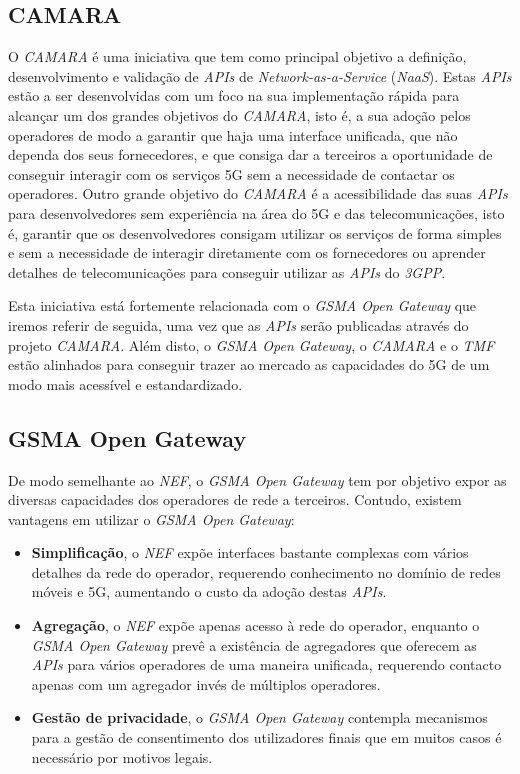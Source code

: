 \subsection{CAMARA}

O \emph{CAMARA} é uma iniciativa que tem como principal objetivo a definição,
desenvolvimento e validação de \emph{APIs} de \emph{Network-as-a-Service}
(\emph{NaaS})\cite{10.1145/3538401.3546825}. Estas \emph{APIs} estão a ser
desenvolvidas com um foco na sua implementação rápida para alcançar um dos
grandes objetivos do \emph{CAMARA}, isto é, a sua adoção pelos operadores de
modo a garantir que haja uma interface unificada, que não dependa dos seus
fornecedores, e que consiga dar a terceiros a oportunidade de conseguir
interagir com os serviços 5G sem a necessidade de contactar os operadores.
Outro grande objetivo do \emph{CAMARA} é a acessibilidade das suas \emph{APIs}
para desenvolvedores sem experiência na área do 5G e das telecomunicações, isto
é, garantir que os desenvolvedores consigam utilizar os serviços de forma
simples e sem a necessidade de interagir diretamente com os fornecedores ou
aprender detalhes de telecomunicações para conseguir utilizar as \emph{APIs} do
\emph{3GPP}.

Esta iniciativa está fortemente relacionada com o \emph{GSMA Open Gateway} que iremos referir
de seguida, uma vez que as \emph{APIs} serão publicadas através do projeto
\emph{CAMARA}\cite{5gamericas}. Além disto, o \emph{GSMA Open Gateway}, o
\emph{CAMARA} e o \emph{TMF} estão alinhados para conseguir trazer ao mercado
as capacidades do 5G de um modo mais acessível e estandardizado.

\subsection{GSMA Open Gateway}

De modo semelhante ao \emph{NEF}, o \emph{GSMA Open Gateway} tem por objetivo
expor as diversas capacidades dos operadores de rede a terceiros.
Contudo, existem vantagens em utilizar o \emph{GSMA Open Gateway}:

\begin{itemize}
	\item \textbf{Simplificação}, o \emph{NEF} expõe interfaces bastante
	      complexas com vários detalhes da rede do operador, requerendo
	      conhecimento no domínio de redes móveis e 5G, aumentando o custo da
	      adoção destas \emph{APIs}.
	\item \textbf{Agregação}, o \emph{NEF} expõe apenas acesso à rede do
	      operador, enquanto o \emph{GSMA Open Gateway} prevê a existência de
	      agregadores que oferecem as \emph{APIs} para vários operadores de uma
	      maneira unificada, requerendo contacto apenas com um agregador invés de
	      múltiplos operadores.
	\item \textbf{Gestão de privacidade}, o \emph{GSMA Open Gateway}
	      contempla mecanismos para a gestão de consentimento dos utilizadores
	      finais que em muitos casos é necessário por motivos legais.
\end{itemize}

